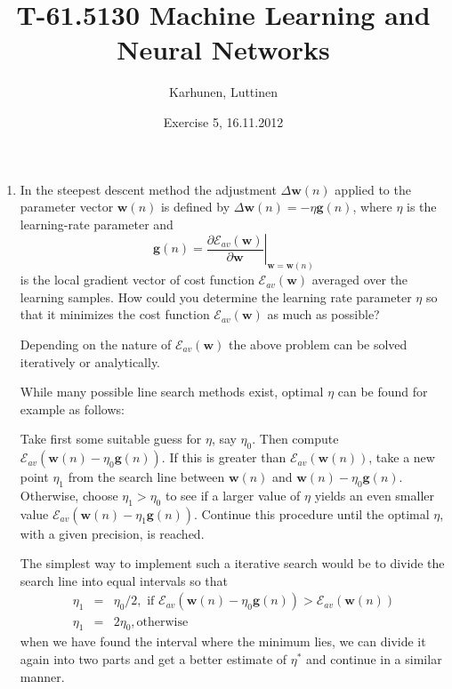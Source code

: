 
\title{T-61.5130 Machine Learning and Neural Networks}
\author{Karhunen, Luttinen}
\date{Exercise 5, 16.11.2012}

\usepackage{url}

\newcommand{\vect}[1]{{\bf{#1}}}
\newcommand{\svect}[1]{\boldsymbol{#1}}
\newcommand{\matr}[1]{\boldsymbol{#1}}




\maketitle

\begin{enumerate}
  
\item In the steepest descent method the adjustment
  $\Delta\mathbf{w}(n)$ applied to the parameter vector
  $\mathbf{w}(n)$ is defined by
  $\Delta\mathbf{w}(n)=-\eta\mathbf{g}(n)$, where $\eta$ is the
  learning-rate parameter and
  \begin{equation*}
    \mathbf{g}(n)=\left.\frac{\partial
        \mathcal{E}_{av}(\mathbf{w})}{\partial \mathbf{w}}\right|_{\mathbf{w}=\mathbf{w}(n)}
  \end{equation*}
  is the local gradient vector of cost
  function $\mathcal{E}_{av}(\mathbf{w})$ averaged over the learning
  samples. How could you determine the learning rate parameter $\eta$ so
  that it minimizes the cost function $\mathcal{E}_{av}(\mathbf{w})$ as much as possible?

  \begin{solution}

    Depending on the nature of $\mathcal{E}_{av}(\mathbf{w})$ the above
    problem can be solved iteratively or analytically.

    While many possible line search methods exist,
    optimal $\eta$ can be found for example as follows:

    Take first some suitable guess for $\eta$, say $\eta_0$. Then compute
    $\mathcal{E}_{av}(\mathbf{w}(n)-\eta_0\mathbf{g}(n))$. If this is
    greater than $\mathcal{E}_{av}(\mathbf{w}(n))$, take a new point
    $\eta_1$ from the search line between $\mathbf{w}(n)$ and
    $\mathbf{w}(n)-\eta_0\mathbf{g}(n)$. Otherwise, choose $\eta_1>\eta_0$
    to see if a larger value of $\eta$ yields an even smaller value
    $\mathcal{E}_{av}(\mathbf{w}(n)-\eta_1\mathbf{g}(n))$. Continue this
    procedure until the optimal $\eta$, with a given precision, is reached.

    The simplest way to implement such a iterative search would be to
    divide the search line into equal intervals so that
    \begin{eqnarray*}
      \eta_1&=&\eta_0/2, \mbox{ if
      }\mathcal{E}_{av}(\mathbf{w}(n)-\eta_0\mathbf{g}(n))>\mathcal{E}_{av}(\mathbf{w}(n))\\
      \eta_1&=&2\eta_0, \mbox{otherwise}
    \end{eqnarray*}
    when we have found the interval where the minimum lies, we can divide
    it again into two parts and get a better estimate of $\eta^*$ and continue in a similar manner.


\end{solution}
\end{enumerate}
